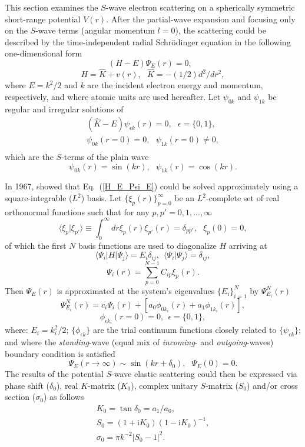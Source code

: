 \documentclass[aip
, pra
, showpacs
, aps
, twocolumn
, groupedaddress
, floatfix
]{revtex4}
\newcommand{\beq}{\begin{equation}}
\newcommand{\eeq}{\end{equation}}
\newcommand{\barr}{\begin{array}}
\newcommand{\earr}{\end{array}}
\begin{document}
This section examines the
$S$-wave electron scattering on a spherically symmetric short-range potential $V(r)$.
After the partial-wave expansion \cite{Taylor72,N82} and focusing only on the $S$-wave terms (angular momentum $l=0$), the scattering
could be described by the time-independent radial Schr\"odinger equation in the following one-dimensional form
\beq
(H-E) \Psi_E (r) =0,  \ \ \  \label{H_E_Psi_E}
\eeq
\beq
H = \hat{K} + v(r), \ \ \ \hat{K} = -(1/2) d^2/dr^2,
\eeq
where $E=k^2/2$ and $k$ are the incident electron energy and momentum, respectively, and where
atomic units are used hereafter.
Let $\psi_{0k}$ and $\psi_{1k}$ be regular and irregular solutions of
\beq \barr{l}
(\hat{K}-E)  \psi_{\epsilon k} (r) =0, \ \ \ \epsilon=\{0,1\},\\
\psi_{0k}(r=0) = 0, \ \ \ \psi_{1k}(r=0) \neq 0,\\
\earr \label{H_0_E_psi}\eeq
which are the $S$-terms of the plain wave
\beq
\psi_{0k}(r) = \sin(kr) ,\ \ \
\psi_{1k}(r) = \cos(kr).
\label{K} \eeq



In 1967, \citet{Harris67} showed that Eq.~(\ref{H_E_Psi_E}) could be solved
approximately using a square-integrable ($L^2$) basis.
Let $\{\xi_p(r)\}_{p=0}^\infty$ be an $L^2$-complete set of real orthonormal functions
such that for any $p,p'=0,1,...,\infty$
\beq
\langle \xi_p | \xi_{p'} \rangle \equiv \int_0^\infty dr \xi_p(r) \xi_{p'}(r) =\delta_{pp'}, \ \ \ \xi_p(0)=0,
\eeq
of which the first $N$ basis functions are used to diagonalize $H$ arriving at
\beq
\langle \Psi_i |H| \Psi_j \rangle = E_i \delta_{ij} , \ \ \langle \Psi_i | \Psi_j \rangle=\delta_{ij},
\eeq
\beq
\Psi_i(r) = \sum_{p=0}^{N-1} C_{ip} \xi_p(r).
\eeq
Then $\Psi_E(r)$ is approximated at the system's eigenvalues $\{E_i\}_{i=1}^{N}$ by $\Psi^N_{E_i}(r)$
\cite{Harris67}
\beq
\Psi^N_{E_i}(r) = c_i \Psi_i(r)  + [a_0 \phi_{0k_i}(r)  + a_1 \phi_{1k_i}(r)],
\label{Psi_EES} \eeq
\beq
\phi_{\epsilon k_i}(r=0) = 0, \ \ \epsilon = \{0,1\},
\eeq
where: $E_i=k_i^2/2$; $\{\phi_{\epsilon k}\}$ are the trial continuum functions closely related to $\{\psi_{\epsilon k}\}$; and where the {\em standing}-wave (equal mix of {\em incoming}- and {\em outgoing}-waves) boundary condition is satisfied
\beq
\Psi_E(r \rightarrow \infty) \sim  \sin(kr+\delta_0), \ \ \ \Psi_E(0)=0.   \label{stand_wave}
\eeq
The results of the potential $S$-wave elastic scattering could then be expressed via
phase shift ($\delta_0$), real $K$-matrix ($K_0$), complex unitary $S$-matrix ($S_{0}$) and/or cross section ($\sigma_{0}$)
as follows
\beq \barr{l}
K_{0} = \tan{\delta_0} = a_1 / a_0,\\
S_{0}=(1+\mbox{i}K_0)(1-\mbox{i}K_0)^{-1}, \\
\sigma_{0}=\pi k^{-2} |S_{0}-1|^2.
\earr \eeq
\end{document}
